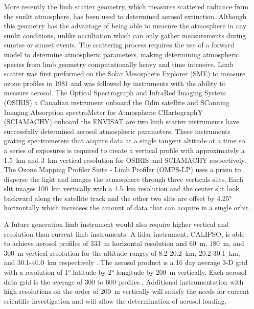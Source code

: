 \documentclass[12pt]{article}
\begin{document}
More recently the limb scatter geometry, which measures scattered radiance from the sunlit atmosphere, has been used to determined aerosol extinction. Although this geometry has the advantage of being able to measure the atmosphere in any sunlit conditions, unlike occultation which can only gather measurements during sunrise or sunset events. The scattering process requires the use of a forward model to determine atmospheric parameters, making determining atmospheric species from limb geometry computationally heavy and time intensive. Limb scatter was first preformed on the Solar Mesosphere Explorer (SME) \citep{Barth1983} to measure ozone profiles in 1981 and was followed by instruments with the ability to measure aerosol. The Optical Spectrograph and InfraRed Imaging System (OSIRIS) a Canadian instrument onboard the Odin satellite \citep{Llewellyn2004} and SCanning Imaging Absorption spectroMeter for Atmospheric CHartographY (SCIAMACHY) onboard the ENVISAT \citep{Bovensmann1999} are two limb scatter instruments have successfully determined aerosol atmospheric parameters. These instruments grating spectrometers that acquire data at a single tangent altitude at a time so a series of exposures is required to create a vertical profile with approximately a 1.5~km and 3~km vertical resolution for OSIRIS and SCIAMACHY respectively. The Ozone Mapping Profiler Suite - Limb Profiler (OMPS-LP) \citep{Rault2013} uses a prism to disperse the light and images the atmosphere through three verticals slits. Each slit images 100~km vertically with a 1.5~km resolution and the center slit look backward along the satellite track and the other two slits are offset by 4.25\si{\degree} horizontally which increases the amount of data that can acquire in a single orbit.

A future generation limb instrument would also require higher vertical and resolution than current limb instruments. A lidar instrument, CALIPSO, is able to achieve aerosol profiles of 333~m horizontal resolution and 60~m, 180~m, and 300~m vertical resolution for the altitude ranges of 8.2-20.2~km, 20.2-30.1~km, and 30.1-40.0~km respectively \citep{Winker2003}. The aerosol product is a 16 day average 3-D grid with a resolution of 1\si{\degree} latitude by 2\si{\degree} longitude by 200~m vertically. Each aerosol data grid is the average of 300 to 600 profiles \citep{Vernier2009}. Additional instrumentation with high resolutions on the order of 200~m vertically will satisfy the needs for current scientific investigation and will allow the determination of aerosol loading.
\end{document}
